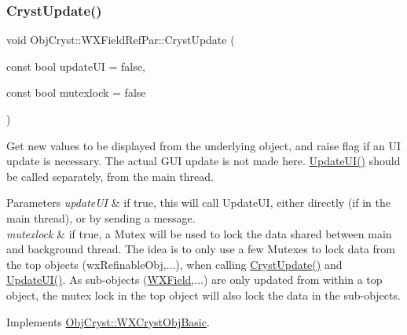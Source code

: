\subsubsection{\texorpdfstring{CrystUpdate()}{CrystUpdate()}}
{\footnotesize\ttfamily void Obj\+Cryst\+::\+W\+X\+Field\+Ref\+Par\+::\+Cryst\+Update (\begin{DoxyParamCaption}\item[{const bool}]{update\+UI = {\ttfamily false},  }\item[{const bool}]{mutexlock = {\ttfamily false} }\end{DoxyParamCaption})\hspace{0.3cm}{\ttfamily [virtual]}}

Get new values to be displayed from the underlying object, and raise flag if an UI update is necessary. The actual G\+UI update is not made here. \mbox{\hyperlink{class_obj_cryst_1_1_w_x_field_ref_par_aa11b53ed79e160ec1201c5743aef80ca}{Update\+U\+I()}} should be called separately, from the main thread.


\begin{DoxyParams}{Parameters}
{\em update\+UI} & if true, this will call Update\+UI, either directly (if in the main thread), or by sending a message. \\
\hline
{\em mutexlock} & if true, a Mutex will be used to lock the data shared between main and background thread. The idea is to only use a few Mutexes to lock data from the top objects (wx\+Refinable\+Obj,...), when calling \mbox{\hyperlink{class_obj_cryst_1_1_w_x_field_ref_par_a91bdc3391485b7376466af6046a62df7}{Cryst\+Update()}} and \mbox{\hyperlink{class_obj_cryst_1_1_w_x_field_ref_par_aa11b53ed79e160ec1201c5743aef80ca}{Update\+U\+I()}}. As sub-\/objects (\mbox{\hyperlink{class_obj_cryst_1_1_w_x_field}{W\+X\+Field}},...) are only updated from within a top object, the mutex lock in the top object will also lock the data in the sub-\/objects. \\
\hline
\end{DoxyParams}


Implements \mbox{\hyperlink{class_obj_cryst_1_1_w_x_cryst_obj_basic_a7ac00ae2ae28f1a6fa26e6fa571186b6}{Obj\+Cryst\+::\+W\+X\+Cryst\+Obj\+Basic}}.

